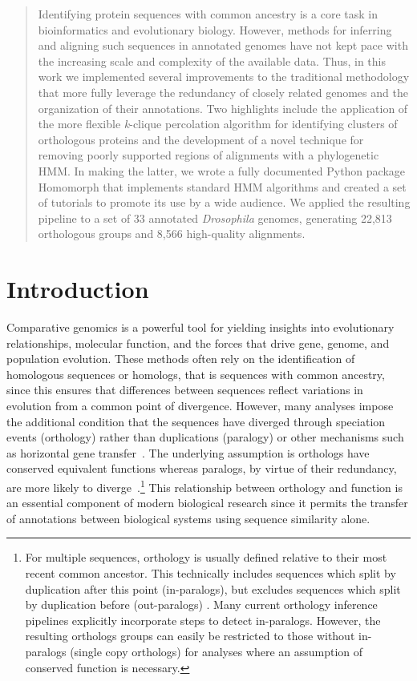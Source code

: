 \begin{abstract}
\noindent
Identifying protein sequences with common ancestry is a core task in bioinformatics and evolutionary biology. However, methods for inferring and aligning such sequences in annotated genomes have not kept pace with the increasing scale and complexity of the available data. Thus, in this work we implemented several improvements to the traditional methodology that more fully leverage the redundancy of closely related genomes and the organization of their annotations. Two highlights include the application of the more flexible \textit{k}-clique percolation algorithm for identifying clusters of orthologous proteins and the development of a novel technique for removing poorly supported regions of alignments with a phylogenetic HMM. In making the latter, we wrote a fully documented Python package Homomorph that implements standard HMM algorithms and created a set of tutorials to promote its use by a wide audience. We applied the resulting pipeline to a set of 33 annotated \textit{Drosophila} genomes, generating 22,813 orthologous groups and 8,566 high-quality alignments.
\end{abstract}

\section{Introduction}
Comparative genomics is a powerful tool for yielding insights into evolutionary relationships, molecular function, and the forces that drive gene, genome, and population evolution. These methods often rely on the identification of homologous sequences or homologs, that is sequences with common ancestry, since this ensures that differences between sequences reflect variations in evolution from a common point of divergence. However, many analyses impose the additional condition that the sequences have diverged through speciation events (orthology) rather than duplications (paralogy) or other mechanisms such as horizontal gene transfer~\cite{Fitch1970}. The underlying assumption is orthologs have conserved equivalent functions whereas paralogs, by virtue of their redundancy, are more likely to diverge~\cite{Ohno1970, Nowak1997, Altenhoff2012, Pegueroles2013, Soria2014}.\footnote{For multiple sequences, orthology is usually defined relative to their most recent common ancestor. This technically includes sequences which split by duplication after this point (in-paralogs), but excludes sequences which split by duplication before (out-paralogs) \cite{Remm2001}. Many current orthology inference pipelines explicitly incorporate steps to detect in-paralogs. However, the resulting orthologs groups can easily be restricted to those without in-paralogs (single copy orthologs) for analyses where an assumption of conserved function is necessary.} This relationship between orthology and function is an essential component of modern biological research since it permits the transfer of annotations between biological systems using sequence similarity alone.

